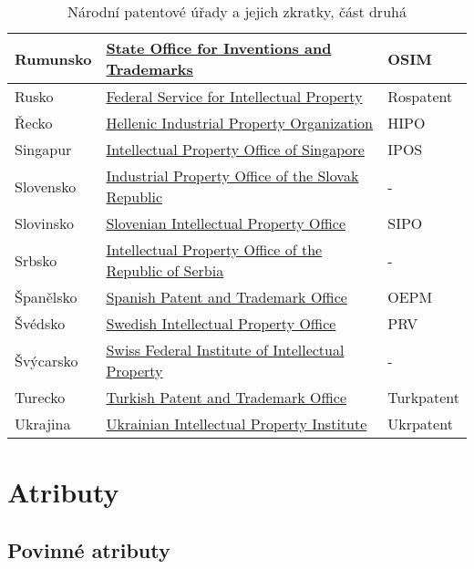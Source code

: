 \begin{table}[h!]
\begin{tabular}{|>{\centering\arraybackslash}p{2.2cm}|>{\centering\arraybackslash}p{8cm}|>{\centering\arraybackslash}p{2cm}|}
	\hline
	Rumunsko & \href{http://www.osim.ro/}{State Office for Inventions and Trademarks}  & OSIM         \\ 
	\hline
	Rusko & \href{https://rospatent.gov.ru/}{Federal Service for Intellectual Property}  & Rospatent         \\ 
	\hline
	Řecko & \href{http://www.obi.gr/el/}{Hellenic Industrial Property Organization}  & HIPO         \\ 
	\hline
	Singapur & \href{http://www.ipos.gov.sg/}{Intellectual Property Office of Singapore}  & IPOS         \\ 
	\hline
	Slovensko & \href{https://www.indprop.gov.sk/}{Industrial Property Office of the Slovak Republic}  & -         \\ 
	\hline
	Slovinsko & \href{http://www.uil-sipo.si/}{Slovenian Intellectual Property Office}  & SIPO         \\ 
	\hline
	Srbsko & \href{http://www.zis.gov.rs/}{Intellectual Property Office of the Republic of Serbia}  & -         \\ 
	\hline
	Španělsko & \href{http://www.oepm.es/}{Spanish Patent and Trademark Office}  & OEPM         \\ 
	\hline
	Švédsko & \href{http://www.prv.se/}{Swedish Intellectual Property Office}  & PRV         \\ 
	\hline
	Švýcarsko & \href{https://www.ige.ch/}{Swiss Federal Institute of Intellectual Property}  & -         \\ 
	\hline
	Turecko & \href{http://www.turkpatent.gov.tr/}{Turkish Patent and Trademark Office}  & Turkpatent         \\ 
	\hline
	Ukrajina & \href{https://ukrpatent.org/en}{Ukrainian Intellectual Property Institute}  & Ukrpatent         \\ 
	\hline
	\end{tabular}
	\caption{Národní patentové úřady a jejich zkratky, část druhá}
	\label{tab:table_offices2}
	\end{table}

\newpage

\section{Atributy}
\subsection{Povinné atributy}


